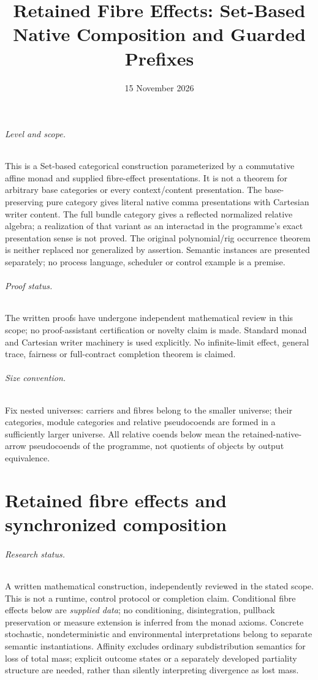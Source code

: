 \documentclass[11pt]{article}
\title{Retained Fibre Effects: Set-Based Native Composition and Guarded Prefixes}
\date{15 November 2026}
\begin{document}
\maketitle
\paragraph{Level and scope.} This is a Set-based categorical construction parameterized by a commutative affine monad and supplied fibre-effect presentations. It is not a theorem for arbitrary base categories or every context/content presentation. The base-preserving pure category gives literal native comma presentations with Cartesian writer content. The full bundle category gives a reflected normalized relative algebra; a realization of that variant as an interactad in the programme's exact presentation sense is not proved. The original polynomial/rig occurrence theorem is neither replaced nor generalized by assertion. Semantic instances are presented separately; no process language, scheduler or control example is a premise.
\paragraph{Proof status.} The written proofs have undergone independent mathematical review in this scope; no proof-assistant certification or novelty claim is made. Standard monad and Cartesian writer machinery is used explicitly. No infinite-limit effect, general trace, fairness or full-contract completion theorem is claimed.
\paragraph{Size convention.} Fix nested universes: carriers and fibres belong to the smaller universe; their categories, module categories and relative pseudocoends are formed in a sufficiently larger universe. All relative coends below mean the retained-native-arrow pseudocoends of the programme, not quotients of objects by output equivalence.
\tableofcontents

\part{Retained fibre effects and synchronized composition}

\paragraph{Research status.} A written mathematical construction, independently reviewed in the stated scope. This is not a runtime, control protocol or completion claim. Conditional fibre effects below are \emph{supplied data}; no conditioning, disintegration, pullback preservation or measure extension is inferred from the monad axioms. Concrete stochastic, nondeterministic and environmental interpretations belong to separate semantic instantiations. Affinity excludes ordinary subdistribution semantics for loss of total mass; explicit outcome states or a separately developed partiality structure are needed, rather than silently interpreting divergence as lost mass.
\end{document}
